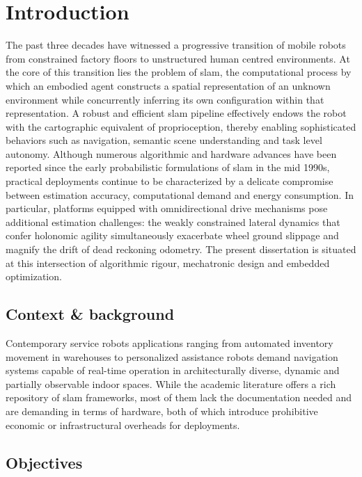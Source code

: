 \chapter{Introduction}
\label{chap:introduction}

The past three decades have witnessed a progressive transition of mobile robots from constrained factory floors to unstructured human centred environments. At the core of this transition lies the problem of \gls{slam}, the computational process by which an embodied agent constructs a spatial representation of an unknown environment while concurrently inferring its own configuration within that representation. A robust and efficient \gls{slam} pipeline effectively endows the robot with the cartographic equivalent of proprioception, thereby enabling sophisticated behaviors such as navigation, semantic scene understanding and task level autonomy. Although numerous algorithmic and hardware advances have been reported since the early probabilistic formulations of \gls{slam} in the mid 1990s, practical deployments continue to be characterized by a delicate compromise between estimation accuracy, computational demand and energy consumption. In particular, platforms equipped with omnidirectional drive mechanisms pose additional estimation challenges: the weakly constrained lateral dynamics that confer holonomic agility simultaneously exacerbate wheel ground slippage and magnify the drift of dead reckoning odometry. The present dissertation is situated at this intersection of algorithmic rigour, mechatronic design and embedded optimization.

\section{Context \& background}
Contemporary service robots applications ranging from automated inventory movement in warehouses to personalized assistance robots demand navigation systems capable of real-time operation in architecturally diverse, dynamic and partially observable indoor spaces. While the academic literature offers a rich repository of \gls{slam} frameworks, most of them lack the documentation needed and are demanding in terms of hardware, both of which introduce prohibitive economic or infrastructural overheads for deployments.


\section{Objectives}


